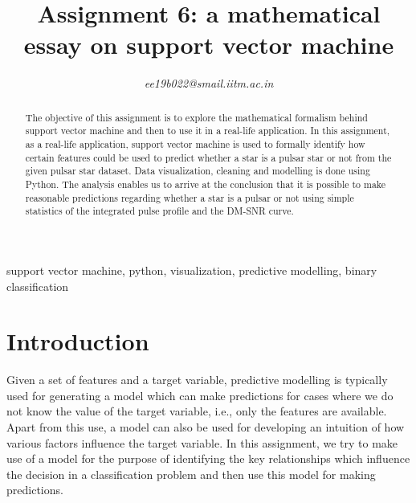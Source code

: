 \documentclass[conference]{IEEEtran}
\begin{document}
\title{Assignment 6: a mathematical essay on support vector machine\\}


\author{
\textit{ee19b022@smail.iitm.ac.in}

}

\maketitle

\begin{abstract}
The objective of this assignment is to explore the mathematical formalism behind support vector machine and then to use it in a real-life application. In this assignment, as a real-life application, support vector machine is used to formally identify how certain features could be used to predict whether a star is a pulsar star or not from the given pulsar star dataset. Data visualization, cleaning and modelling is done using Python. The analysis enables us to arrive at the conclusion that it is possible to make reasonable predictions regarding whether a star is a pulsar or not using simple statistics of the integrated pulse profile and the DM-SNR curve. 
\end{abstract}

\begin{IEEEkeywords}
support vector machine, python, visualization, predictive modelling, binary classification
\end{IEEEkeywords}

\section{Introduction}

Given a set of features and a target variable, predictive modelling is typically used for generating a model which can make predictions for cases where we do not know the value of the target variable, i.e., only the features are available. Apart from this use, a model can also be used for developing an intuition of how various factors influence the target variable. In this assignment, we try to make use of a model for the purpose of identifying the key relationships which influence the decision in a classification problem and then use this model for making predictions.
\end{document}
